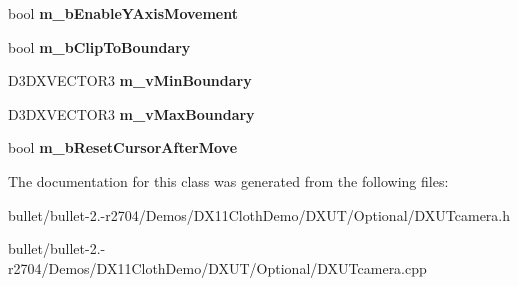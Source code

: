 \begin{DoxyCompactItemize}
\item 
\hypertarget{class_c_base_camera_a2fbcc041572a057cfd03c27f157eaf08}{bool {\bfseries m\+\_\+b\+Enable\+Y\+Axis\+Movement}}\label{class_c_base_camera_a2fbcc041572a057cfd03c27f157eaf08}

\item 
\hypertarget{class_c_base_camera_a1087c9e2eaf936be735df38f6f8719ad}{bool {\bfseries m\+\_\+b\+Clip\+To\+Boundary}}\label{class_c_base_camera_a1087c9e2eaf936be735df38f6f8719ad}

\item 
\hypertarget{class_c_base_camera_a63dd58475f7382d77ada28b763e7a422}{D3\+D\+X\+V\+E\+C\+T\+O\+R3 {\bfseries m\+\_\+v\+Min\+Boundary}}\label{class_c_base_camera_a63dd58475f7382d77ada28b763e7a422}

\item 
\hypertarget{class_c_base_camera_a8f823201300bc646e232a82a4c5b6eea}{D3\+D\+X\+V\+E\+C\+T\+O\+R3 {\bfseries m\+\_\+v\+Max\+Boundary}}\label{class_c_base_camera_a8f823201300bc646e232a82a4c5b6eea}

\item 
\hypertarget{class_c_base_camera_a7dd4c284bd8f3058eb047e0d90eee8ea}{bool {\bfseries m\+\_\+b\+Reset\+Cursor\+After\+Move}}\label{class_c_base_camera_a7dd4c284bd8f3058eb047e0d90eee8ea}

\end{DoxyCompactItemize}


The documentation for this class was generated from the following files\+:\begin{DoxyCompactItemize}
\item 
bullet/bullet-\/2.-\/r2704/\+Demos/\+D\+X11\+Cloth\+Demo/\+D\+X\+U\+T/\+Optional/D\+X\+U\+Tcamera.\+h\item 
bullet/bullet-\/2.-\/r2704/\+Demos/\+D\+X11\+Cloth\+Demo/\+D\+X\+U\+T/\+Optional/D\+X\+U\+Tcamera.\+cpp\end{DoxyCompactItemize}
